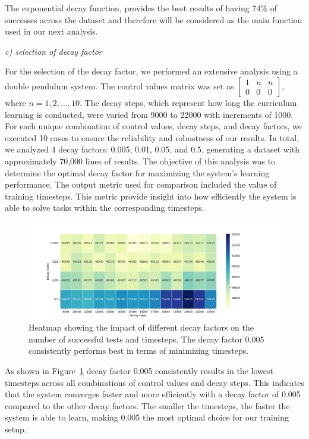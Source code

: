 The exponential decay function, provides the best results of having 74\% of successes across the dataset and therefore will be considered as the main function used in our next analysis. 

\textit{c) selection of decay factor}

For the selection of the decay factor, we performed an extensive analysis using a double pendulum system. The control values matrix was set as \(\begin{bmatrix} 1 & n & n \\ 0 & 0 & 0 \end{bmatrix}\), where \(n = 1, 2, \ldots, 10\). The decay steps, which represent how long the curriculum learning is conducted, were varied from 9000 to 22000 with increments of 1000. For each unique combination of control values, decay steps, and decay factors, we executed 10 cases to ensure the reliability and robustness of our results. In total, we analyzed 4 decay factors: 0.005, 0.01, 0.05, and 0.5, generating a dataset with approximately 70,000 lines of results. The objective of this analysis was to determine the optimal decay factor for maximizing the system's learning performance.
The output metric used for comparison included the value of training timesteps. This metric provide insight into how efficiently the system is able to solve tasks within the corresponding timesteps.

\begin{figure}[h] 
	\centering 
	\includegraphics[width=15cm]{Figures/MaxSuccessfulTestsTimesteps_heatmap.png} 
	\caption{Heatmap showing the impact of different decay factors on the number of successful tests and timesteps. The decay factor 0.005 consistently performs best in terms of minimizing timesteps.} 
	\label{fig: decay factors comparison}
\end{figure}

As shown in Figure~\ref{fig: decay factors comparison} decay factor 0.005 consistently results in the lowest timesteps across all combinations of control values and decay steps. This indicates that the system converges faster and more efficiently with a decay factor of 0.005 compared to the other decay factors. The smaller the timesteps, the faster the system is able to learn, making 0.005 the most optimal choice for our training setup.

